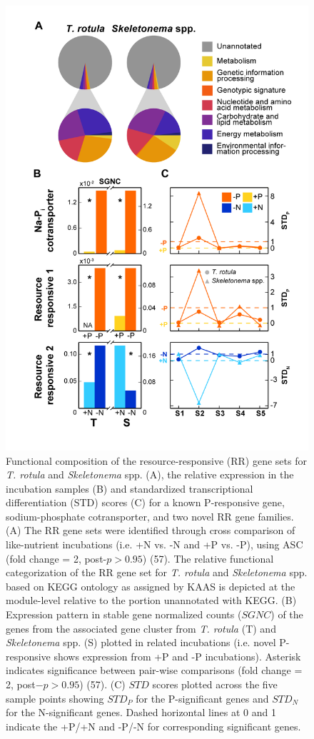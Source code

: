 

\begin{figure}[p!]
  \centering
    \includegraphics[width=.65\textwidth]{Images/C3_Figure4_BarLinePlots.png}
    \caption[Functional composition of resource-responsive gene set]{Functional composition of the resource-responsive (RR) gene sets for \textit{T. rotula} and \textit{Skeletonema} spp. (A), the relative expression in the incubation samples (B) and standardized transcriptional differentiation (STD) scores (C) for a known P-responsive gene, sodium-phosphate cotransporter, and two novel RR gene families. (A) The RR gene sets were identified through cross comparison of like-nutrient incubations (i.e. +N vs. -N and +P vs. -P), using ASC (fold change = 2, post-$p > 0.95$) (57). The relative functional categorization of the RR gene set for \textit{T. rotula} and \textit{Skeletonema} spp. based on KEGG ontology as assigned by KAAS is depicted at the module-level relative to the portion unannotated with KEGG. (B) Expression pattern in stable gene normalized counts ($SGNC$) of the genes from the associated gene cluster from \textit{T. rotula} (T) and \textit{Skeletonema} spp. (S) plotted in related incubations (i.e. novel P-responsive shows expression from +P and -P incubations). Asterisk indicates significance between pair-wise comparisons (fold change = 2, post$-p > 0.95$) (57). (C) $STD$ scores plotted across the five sample points showing $STD_P$ for the P-significant genes and $STD_N$ for the N-significant genes. Dashed horizontal lines at 0 and 1 indicate the +P/+N and -P/-N for corresponding significant genes.} 
  \label{fig:c3f4}
\end{figure}

